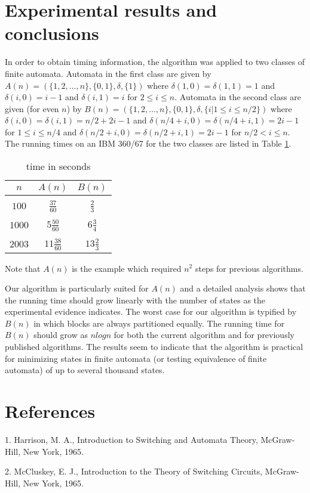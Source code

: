 \section{Experimental results and conclusions}

In order to obtain timing information, the algorithm was applied to two classes of finite automata.
Automata in the first class are given by $A(n) = (\{1, 2, \ldots, n\}, \{0, 1\}, \delta, \{ 1 \})$
where $\delta (1,0) = \delta (1,1) = 1$ and
$\delta (i, 0) = i - 1$ and $\delta (i, 1) = i$ for $2 \leq i \leq n$.
Automata in the second class are given (for even $n$) by
$B(n) = (\{1, 2, \ldots, n\}, \{0, 1\}, \delta, \{i|1 \leq i \leq n/2 \})$ where
$\delta (i, 0) = \delta (i, 1) = n/2 + 2i - 1$ and
$\delta (n/4 + i, 0) = \delta (n/4 + i, 1) = 2i - 1$ for $1 \leq i \leq n/4$
and $\delta (n/2+i, 0) = \delta (n/2+i, 1) = 2i - 1$ for
$n/2 < i \leq n$. The running times on an IBM 360/67 for the two classes are listed in Table \ref{results01}.

\begin{table}[ht]
\caption{time in seconds}
\label{results01}
\begin{center}
\begin{tabular}{c|c|c}
$n$     &  $A(n)$              &  $B(n)$             \\
\hline
        &                      &                     \\
$100$   &  $   \frac{37}{60}$  &  $   \frac{2}{3}$   \\
        &                      &                     \\
$1000$  &  $5  \frac{50}{60}$  &  $6  \frac{3}{4}$   \\
        &                      &                     \\
$2003$  &  $11 \frac{38}{60}$  &  $13 \frac{2}{3}$   \\
\end{tabular}
\end{center}
\end{table}

Note that $A(n)$ is the example which required $n^2$ steps for previous algorithms.

Our algorithm is particularly suited for $A(n)$ and a detailed analysis shows that the running time
should grow linearly with the number of states as the experimental evidence indicates. The worst case for
our algorithm is typified by $B(n)$ in which blocks are always partitioned equally. The running time for
$B(n)$ should grow as $n log n$ for both the current algorithm and for previously published algorithms. The
results seem to indicate that the algorithm is practical for minimizing states in finite automata (or testing
equivalence of finite automata) of up to several thousand states.

\section{References}

1. Harrison, M. A., Introduction to Switching and Automata Theory, McGraw-Hill, New York, 1965.

2. McCluskey, E. J., Introduction to the Theory of Switching Circuits, McGraw-Hill, New York, 1965.
